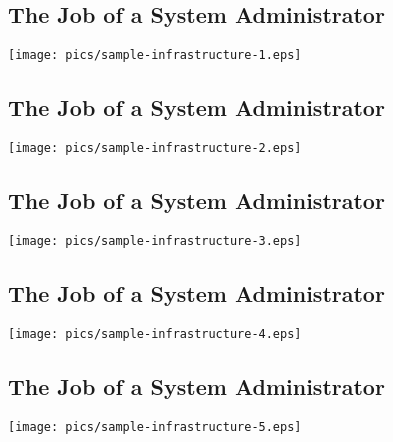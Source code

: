 \documentclass[xga]{xdvislides}
\begin{document}
\subsection{The Job of a System Administrator}
\vspace*{\fill}
\begin{center}
	\texttt{[image: pics/sample-infrastructure-1.eps]} \\
\end{center}
\vspace*{\fill}

\subsection{The Job of a System Administrator}
\vspace*{\fill}
\begin{center}
	\texttt{[image: pics/sample-infrastructure-2.eps]} \\
\end{center}
\vspace*{\fill}

\subsection{The Job of a System Administrator}
\vspace*{\fill}
\begin{center}
	\texttt{[image: pics/sample-infrastructure-3.eps]} \\
\end{center}
\vspace*{\fill}

\subsection{The Job of a System Administrator}
\vspace*{\fill}
\begin{center}
	\texttt{[image: pics/sample-infrastructure-4.eps]} \\
\end{center}
\vspace*{\fill}

\subsection{The Job of a System Administrator}
\vspace*{\fill}
\begin{center}
	\texttt{[image: pics/sample-infrastructure-5.eps]} \\
\end{center}
\vspace*{\fill}
\end{document}
